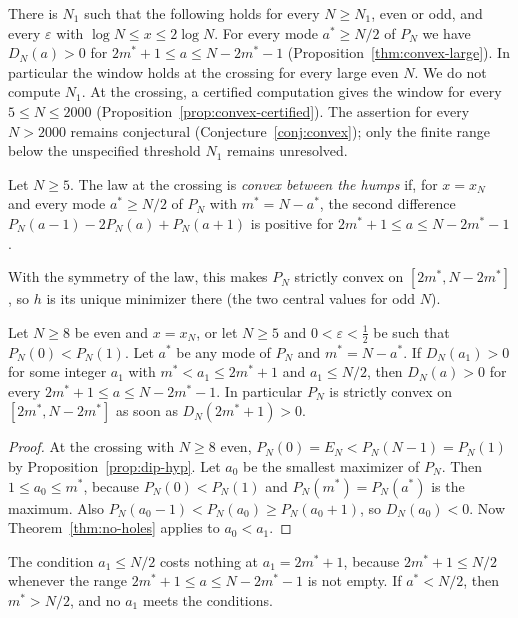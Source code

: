 \begin{proposition}\label{prop:main-window}
There is $N_1$ such that the following holds for every $N\ge N_1$, even
or odd, and every $\varepsilon$ with $\log N\le x\le2\log N$. For every
mode $a^*\ge N/2$ of $P_N$ we have $D_N(a)>0$ for
$2m^*+1\le a\le N-2m^*-1$ (Proposition~\ref{thm:convex-large}). In
particular the window holds at the crossing for every large even $N$.
We do not compute $N_1$. At the crossing, a certified computation gives
the window for every $5\le N\le2000$
(Proposition~\ref{prop:convex-certified}). The assertion for every $N>2000$
remains conjectural (Conjecture~\ref{conj:convex}); only the finite range
below the unspecified threshold $N_1$ remains unresolved.
\end{proposition}

\begin{definition}\label{def:convex}
Let $N\ge5$. The law at the crossing is \emph{convex between the humps} if,
for $x=x_N$ and every mode $a^*\ge N/2$ of $P_N$ with $m^*=N-a^*$, the second
difference $P_N(a-1)-2P_N(a)+P_N(a+1)$ is positive for
$2m^*+1\le a\le N-2m^*-1$.
\end{definition}

With the symmetry of the law, this makes $P_N$ strictly convex on
$[2m^*,N-2m^*]$, so $h$ is its unique minimizer there (the two central values
for odd $N$).

\begin{corollary}\label{cor:one-point}
Let $N\ge8$ be even and $x=x_N$, or let $N\ge5$ and $0<\varepsilon<\frac12$
be such that $P_N(0)<P_N(1)$. Let $a^*$ be any mode of $P_N$ and
$m^*=N-a^*$. If $D_N(a_1)>0$ for some integer $a_1$ with $m^*<a_1\le2m^*+1$
and $a_1\le N/2$, then $D_N(a)>0$ for every $2m^*+1\le a\le N-2m^*-1$. In
particular $P_N$ is strictly convex on $[2m^*,N-2m^*]$ as soon as
$D_N(2m^*+1)>0$.
\end{corollary}

\begin{proof}
At the crossing with $N\ge8$ even, $P_N(0)=E_N<P_N(N-1)=P_N(1)$ by
Proposition~\ref{prop:dip-hyp}. Let $a_0$ be the smallest maximizer of $P_N$.
Then $1\le a_0\le m^*$, because $P_N(0)<P_N(1)$ and $P_N(m^*)=P_N(a^*)$ is the
maximum. Also $P_N(a_0-1)<P_N(a_0)\ge P_N(a_0+1)$, so $D_N(a_0)<0$. Now
Theorem~\ref{thm:no-holes} applies to $a_0<a_1$.
\end{proof}

The condition $a_1\le N/2$ costs nothing at $a_1=2m^*+1$, because
$2m^*+1\le N/2$ whenever the range $2m^*+1\le a\le N-2m^*-1$ is not empty.
If $a^*<N/2$, then $m^*>N/2$, and no $a_1$ meets the conditions.

